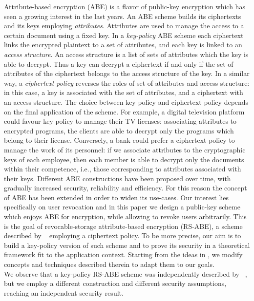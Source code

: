 \documentclass[a4paper,10pt]{article}
\begin{document}
	Attribute-based encryption (ABE) is a flavor of public-key encryption which has seen a growing interest in the last years. 
	An ABE scheme builds its ciphertexts and its keys employing \emph{attributes}. Attributes are used to manage the access to a certain document using a fixed key. In a \emph{key-policy} ABE scheme each ciphertext links the encrypted plaintext to a set of attributes, and each key is linked to an \emph{access structure}. An access structure is a list of sets of attributes which the key is able to decrypt. Thus a key can decrypt a ciphertext if and only if the set of attributes of the ciphertext belongs to the access structure of the key.
	In a similar way, a \emph{ciphertext-policy} reverses the roles of set of attributes and access structure: in this case, a key is associated with the set of attributes, and a ciphertext with an access structure.
	The choice between key-policy and ciphertext-policy depends on the final application of the scheme. For example, a digital television platform could favour key policy to manage their TV licenses: associating attributes to encrypted programs, the clients are able to decrypt only the programs which belong to their license. Conversely, a bank could prefer a ciphertext policy to manage the work of its personnel: if we associate attributes to the cryptographic keys of each employee, then each member is able to decrypt only the documents within their competence, i.e., those corresponding to attributes associated with their keys.
	Different ABE constructions have been proposed over time, with gradually increased security, reliability and efficiency.
	For this reason the concept of ABE has been extended in order to widen its use-cases.
	Our interest lies specifically on user revocation and in this paper we design a public-key scheme which enjoys ABE for encryption, while allowing to  revoke users arbitrarily.
	This is the goal of revocable-storage attribute-based encryption (RS-ABE), a scheme described by \citeauthor{lee2013RSABE}~\cite{lee2013RSABE} employing a ciphertext policy. To be more precise, our aim is to build a key-policy version of such scheme and to prove its security in a theoretical framework fit to the application context. Starting from the ideas in \cite{lee2013RSABE}, we modify concepts and techniques described therein to adapt them to our goals.\\
	We observe that a key-policy RS-ABE scheme was independently described by \citeauthor{lee2014}~\cite{lee2014}, but we employ a different construction and different security assumptions, reaching an independent security result.
	
\end{document}
